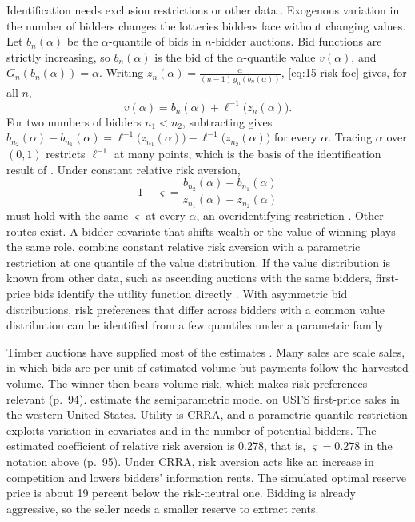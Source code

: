Identification needs exclusion restrictions or other data \citep[Section 6.4]{AtheyHaile2007}. Exogenous
variation in the number of bidders changes the lotteries bidders face without changing values. Let
$b_n(\alpha)$ be the $\alpha$-quantile of bids in $n$-bidder auctions. Bid functions are strictly
increasing, so $b_n(\alpha)$ is the bid of the $\alpha$-quantile value $v(\alpha)$, and
$G_n(b_n(\alpha))=\alpha$. Writing $z_n(\alpha)=\frac{\alpha}{(n-1)\,g_n(b_n(\alpha))}$,
\eqref{eq:15-risk-foc} gives, for all $n$,
\begin{equation}\label{eq:15-risk-quantile}
v(\alpha)=b_n(\alpha)+\ell^{-1}\big(z_n(\alpha)\big).
\end{equation}
For two numbers of bidders $n_1<n_2$, subtracting gives
$b_{n_2}(\alpha)-b_{n_1}(\alpha)=\ell^{-1}\big(z_{n_1}(\alpha)\big)-\ell^{-1}\big(z_{n_2}(\alpha)\big)$ for every
$\alpha$. Tracing $\alpha$ over $(0,1)$ restricts $\ell^{-1}$ at many points, which is the basis of the
identification result of \citet{GuerrePerrigneVuong2009}. Under constant relative risk aversion,
\[
1-\varsigma=\frac{b_{n_2}(\alpha)-b_{n_1}(\alpha)}{z_{n_1}(\alpha)-z_{n_2}(\alpha)}
\]
must hold with the same $\varsigma$ at every $\alpha$, an overidentifying restriction
\citep[Section 6.4.1]{AtheyHaile2007}. Other routes exist. A bidder covariate that shifts wealth or
the value of winning plays the same role. \citet{CampoEtAl2011} combine constant relative risk aversion
with a parametric restriction at one quantile of the value distribution. If the value distribution is
known from other data, such as ascending auctions with the same bidders, first-price bids identify the
utility function directly \citep[footnote 74]{AtheyHaile2007}. With asymmetric bid distributions, risk
preferences that differ across bidders with a common value distribution can be identified from a few
quantiles under a parametric family \citep[Section 6.4.2]{AtheyHaile2007}.

Timber auctions have supplied most of the estimates \citep[Section 2.4]{HortacsuPerrigne2021}. Many
sales are scale sales, in which bids are per unit of estimated volume but payments follow the
harvested volume. The winner then bears volume risk, which makes risk preferences relevant (p.~94).
\citet{CampoEtAl2011} estimate the semiparametric model on USFS first-price sales in the western
United States. Utility is CRRA, and a parametric quantile restriction exploits variation in covariates
and in the number of potential bidders. The estimated coefficient of relative risk aversion is 0.278,
that is, $\varsigma=0.278$ in the notation above (p.~95). Under CRRA, risk aversion acts like an
increase in competition and lowers bidders' information rents. The simulated optimal reserve price is
about 19 percent below the risk-neutral one. Bidding is already aggressive, so the seller needs a
smaller reserve to extract rents.

